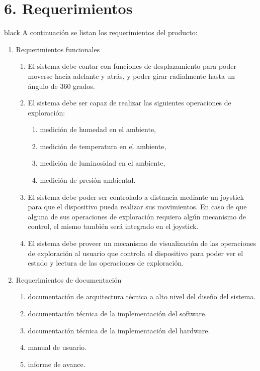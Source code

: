 \documentclass[
11pt, %
]{charter}
\begin{document}
\section{6. Requerimientos}
\label{sec:requerimientos}
\begin{consigna}{black}
A continuación se listan los requerimientos del producto:
\begin{enumerate}	
	\item Requerimientos funcionales		
	\begin{enumerate}			
		\item El sistema debe contar con funciones de desplazamiento para poder moverse hacia adelante y atrás, y poder girar radialmente hasta un ángulo de 360 grados.			
		\item El sistema debe ser capaz de realizar las siguientes operaciones de exploración:			
			\begin{enumerate}				
				\item medición de humedad en el ambiente,				
				\item medición de temperatura en el ambiente,				
				\item medición de luminosidad en el ambiente,				
				\item medición de presión ambiental.			
			\end{enumerate}			
		\item El sistema debe poder ser controlado a distancia mediante un joystick para que el dispositivo pueda realizar sus movimientos. En caso de que alguna de sus operaciones de exploración requiera algún mecanismo de control, el mismo también será integrado en el joystick.		
		\item El sistema debe proveer un mecanismo de visualización de las operaciones de exploración al usuario que controla el dispositivo para poder ver el estado y lectura de las operaciones de exploración.		
		\end{enumerate}	
	\item Requerimientos de documentación		
		\begin{enumerate}			
			\item documentación de arquitectura técnica a alto nivel del diseño del sistema.			
			\item documentación técnica de la implementación del software.			
			\item documentación técnica de la implementación del hardware.			
			\item manual de usuario.	
			\item informe de avance.

\end{enumerate}
\end{enumerate}
\end{consigna}
\end{document}
